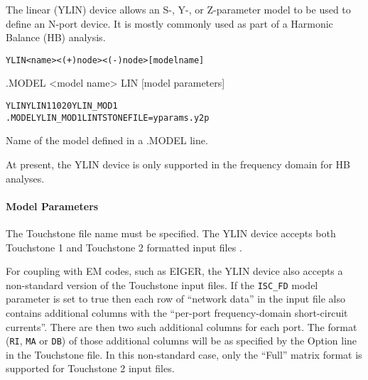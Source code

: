 

The linear (YLIN) device allows an S-, Y-, or Z-parameter model to
be used to define an N-port device.  It is mostly commonly used
as part of a Harmonic Balance (HB) analysis.

\begin{Device}\label{YLIN_DEVICE}

\device
\begin{alltt}
YLIN <name>  <(+) node> <(-) node> [model name]
\end{alltt}

\model
.MODEL <model name> LIN [model parameters]

\examples
\begin{alltt}
YLIN YLIN1 1 0 2 0 YLIN_MOD1
.MODEL YLIN_MOD1 LIN TSTONEFILE=yparams.y2p
\end{alltt}

\parameters
\begin{Parameters}

  Name of the model defined in a .MODEL line.

\end{Parameters}

\comments
At present, the YLIN device is only supported in the frequency domain for HB analyses.

\end{Device}


\paragraph{Model Parameters}


The Touchstone file name must be specified.  The YLIN device accepts both
Touchstone 1 and Touchstone 2 formatted input files \cite{touchstone2_std_2009}.

For coupling with EM codes, such as EIGER, the YLIN device also accepts
a non-standard version of the Touchstone input files.  If the \texttt{ISC\_FD}
model parameter is set to true then each row of ``network data'' in the input
file also contains additional columns with the ``per-port frequency-domain
short-circuit currents''.   There are then two such additional columns for each
port.  The format (\texttt{RI}, \texttt{MA} or \texttt{DB}) of those additional
columns will be as specified by the Option line in the Touchstone file.  In this
non-standard case, only the ``Full'' matrix format is supported for
Touchstone 2 input files.




